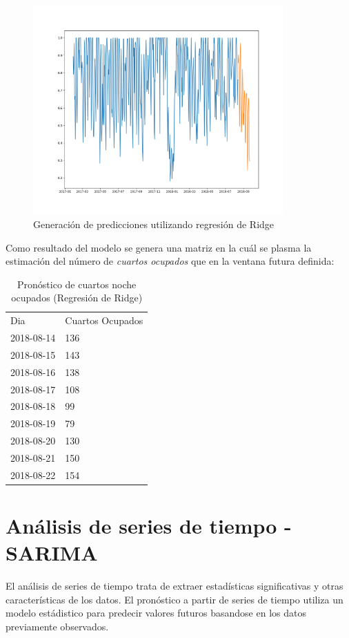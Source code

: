 \begin{figure}[H]
  \centering
      \includegraphics[width=\maxwidth,height=8cm]{figures/RidgePronostico.png}    
  \caption{Generación de predicciones utilizando regresión de Ridge}
\end{figure}


Como resultado del modelo se genera una matriz en la cuál se plasma la estimación del número de \emph{cuartos ocupados} que en la ventana futura definida:

\begin{table}[H]
\centering
\begin{tabular}{ll}
Dia        & Cuartos Ocupados \\
2018-08-14 & 136              \\
2018-08-15 & 143              \\
2018-08-16 & 138              \\
2018-08-17 & 108              \\
2018-08-18 & 99               \\
2018-08-19 & 79               \\
2018-08-20 & 130              \\
2018-08-21 & 150              \\
2018-08-22 & 154              
\end{tabular}
\caption{Pronóstico de cuartos noche ocupados (Regresión de Ridge)} 
\end{table}

\section*{Análisis de series de tiempo - SARIMA}

El análisis de series de tiempo trata de extraer estadísticas significativas y otras características de los datos. El pronóstico a partir de series de tiempo utiliza un modelo estádistico para predecir valores futuros basandose en los datos previamente observados.

